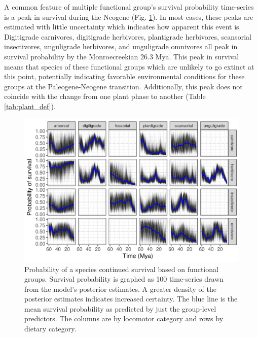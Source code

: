 \documentclass[12pt,letterpaper]{article}
\begin{document}
A common feature of multiple functional group's survival probability time-series is a peak in survival during the Neogene (Fig. \ref{fig:eco_survival}). In most cases, these peaks are estimated with little uncertainty which indicates how apparent this event is. Digitigrade carnivores, digitigrade herbivores, plantigrade herbivores, scansorial insectivores, unguligrade herbivores, and unguligrade omnivores all peak in survival probability by the Monroecreekian 26.3 Mya. This peak in survival means that species of these functional groups which are unlikely to go extinct at this point, potentially indicating favorable environmental conditions for these groups at the Paleogene-Neogene transition. Additionally, this peak does not coincide with the change from one plant phase to another (Table \ref{tab:plant_def}). 
\begin{figure}[ht]
  \centering
  \includegraphics[width=\textwidth,height=0.4\textheight,keepaspectratio=true]{figure/ecotype_survival_bd}
  \caption{Probability of a species continued survival based on functional groups. Survival probability is graphed as 100 time-series drawn from the model's posterior estimates. A greater density of the posterior estimates indicates increased certainty. The blue line is the mean survival probability as predicted by just the group-level predictors. The columns are by locomotor category and rows by dietary category.}
  \label{fig:eco_survival}
\end{figure}
\end{document}
